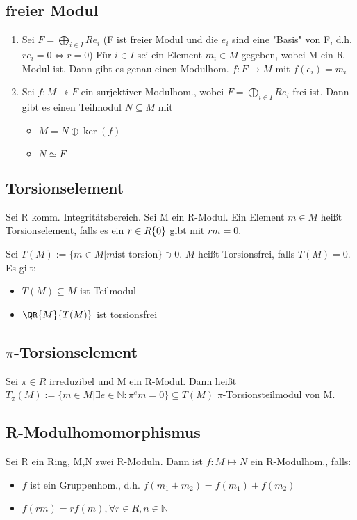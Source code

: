 \subsection{freier Modul}
\begin{enumerate}
	\item Sei $F = \bigoplus \limits_{i \in I} R e_i $ (F ist freier Modul und die $e_i$ sind eine "Basis" von F, d.h. $r e_i = 0 \Leftrightarrow r=0$)
	Für $i\in I$ sei ein Element $m_i \in M$ gegeben, wobei M ein R-Modul ist.
	Dann gibt es genau einen Modulhom. $f:F \rightarrow M $ mit $f(e_i) = m_i$
	\item Sei $f:M \twoheadrightarrow F$ ein surjektiver Modulhom., wobei $F = \bigoplus \limits_{i \in I}R e_i$ frei ist. Dann gibt es einen Teilmodul $N \subseteq M$ mit
	\begin{itemize}
		\item $M = N \oplus \ker(f)$
		\item $N \simeq F$
	\end{itemize}
\end{enumerate}
\subsection{Torsionselement}
Sei R komm. Integritätsbereich. Sei M ein R-Modul. Ein Element $m\in M$ heißt Torsionselement, falls es ein $r\in R\\\{0\}$ gibt mit $rm=0$.

Sei $T(M) := \{m \in M | m \text{ist torsion} \} \ni 0$. $M$ heißt Torsionsfrei, falls $T(M) = 0$. Es gilt:
\begin{itemize}
	\item $T(M) \subseteq M$ ist Teilmodul
	\item $\QR{M}{T(M)}$ ist torsionsfrei
\end{itemize}

\subsection{$\pi$-Torsionselement}
Sei $\pi \in R$ irreduzibel und M ein R-Modul. Dann heißt $T_\pi (M):= \{m \in M | \exists e \in \mathbb{N}: \pi^em = 0 \} \subseteq T(M)$ $\pi$-Torsionsteilmodul von M.

\subsection{R-Modulhomomorphismus}
Sei R ein Ring, M,N zwei R-Moduln. Dann ist $f:M\mapsto N$ ein R-Modulhom., falls:
\begin{itemize}
	\item $f$ ist ein Gruppenhom., d.h. $f(m_1+m_2) = f(m_1)+f(m_2)$
	\item $f(rm) = rf(m), \forall r \in R, n\in \mathbb{N}$
\end{itemize}

